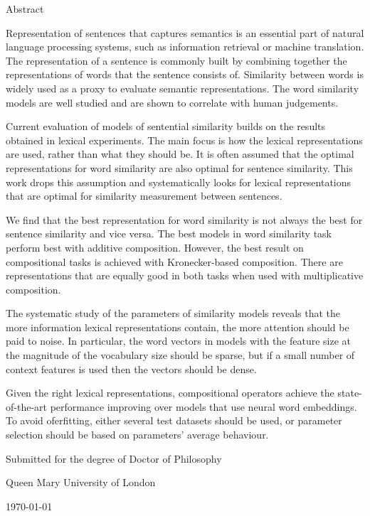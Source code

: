 {\Large \headingfont \thetitle}

\vspace{1em}

{\large \headingfont \theauthor}

\vspace{1em}

{\headingfont Abstract}

Representation of sentences that captures semantics is an essential part of natural language processing systems, such as information retrieval or machine translation. The representation of a sentence is commonly built by combining together the representations of words that the sentence consists of. Similarity between words is widely used as a proxy to evaluate semantic representations. The word similarity models are well studied and are shown to correlate with human judgements.

Current evaluation of models of sentential similarity builds on the results obtained in lexical experiments. The main focus is how the lexical representations are used, rather than what they should be. It is often assumed that the optimal representations for word similarity are also optimal for sentence similarity. This work drops this assumption and systematically looks for lexical representations that are optimal for similarity measurement between sentences.

We find that the best representation for word similarity is not always the best for sentence similarity and vice versa. The best models in word similarity task perform best with additive composition. However, the best result on compositional tasks is achieved with Kronecker-based composition. There are representations that are equally good in both tasks when used with multiplicative composition.

The systematic study of the parameters of similarity models reveals that the more information lexical representations contain, the more attention should be paid to noise. In particular, the word vectors in models with the feature size at the magnitude of the vocabulary size should be sparse, but if a small number of context features is used then the vectors should be dense.

Given the right lexical representations, compositional operators achieve the state-of-the-art performance improving over models that use neural word embeddings. To avoid oferfitting, either several test datasets should be used, or parameter selection should be based on parameters' average behaviour.

\vfill


Submitted for the degree of Doctor of Philosophy

Queen Mary University of London

\today


